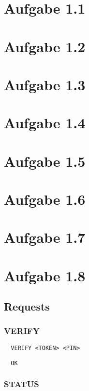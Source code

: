 \documentclass[10pt,a4paper]{article}
\begin{document}
\section{Aufgabe 1.1}

\section{Aufgabe 1.2}

\section{Aufgabe 1.3}

\section{Aufgabe 1.4}

\section{Aufgabe 1.5}

\section{Aufgabe 1.6}

\section{Aufgabe 1.7}

\section{Aufgabe 1.8}

\subsection{Requests}

\subsubsection{VERIFY}

\begin{lstlisting}
  VERIFY <TOKEN> <PIN>
\end{lstlisting}

\begin{lstlisting}
  OK
\end{lstlisting}

\subsubsection{STATUS}
\end{document}
